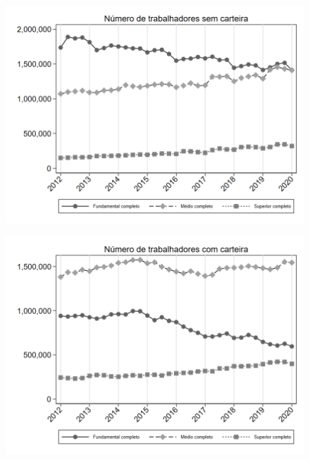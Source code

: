 \begin{frame}[label=_composicao_demografica_educacao_n_empregadoSC]{}
\textit{\hyperlink{_composicao_demografica_educacao}{}}
\begin{figure}
  \centering
  \includegraphics[width=1.0\linewidth]{../../analysis/output/composicao_demografica/educacao/_composicao_demografica_educacao_n_empregadoSC.png}
  \caption{}
  \label{fig:_composicao_demografica_educacao_n_empregadoSC}
\end{figure}
\end{frame}

\begin{frame}[label=_composicao_demografica_educacao_n_empregadoCC]{}
\textit{\hyperlink{_composicao_demografica_educacao}{}}
\begin{figure}
  \centering
  \includegraphics[width=1.0\linewidth]{../../analysis/output/composicao_demografica/educacao/_composicao_demografica_educacao_n_empregadoCC.png}
  \caption{}
  \label{fig:_composicao_demografica_educacao_n_empregadoCC}
\end{figure}
\end{frame}

